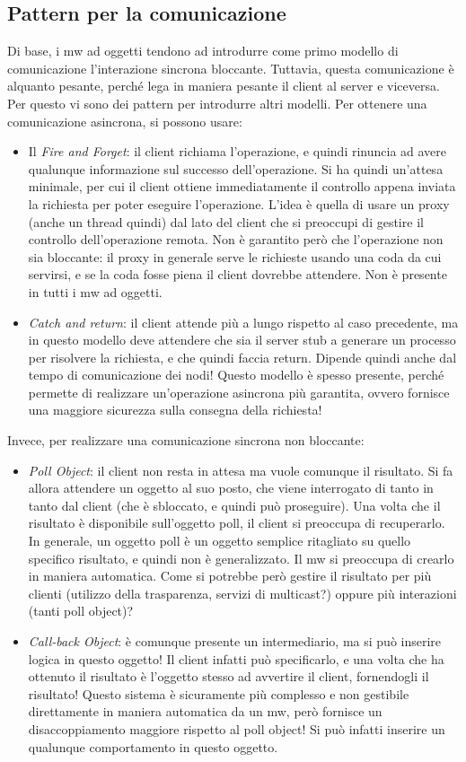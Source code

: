 \subsection{Pattern per la comunicazione}
Di base, i mw ad oggetti tendono ad introdurre come primo modello di comunicazione l'interazione sincrona bloccante.
Tuttavia, questa comunicazione è alquanto pesante, perché lega in maniera pesante il client al server e viceversa.
Per questo vi sono dei pattern per introdurre altri modelli.
Per ottenere una comunicazione asincrona, si possono usare:
\begin{itemize}
 \item Il \textit{Fire and Forget}: il client richiama l'operazione, e quindi rinuncia ad avere qualunque informazione
 sul successo dell'operazione. Si ha quindi un'attesa minimale, per cui il client ottiene immediatamente il controllo
 appena inviata la richiesta per poter eseguire l'operazione. L'idea è quella di usare un proxy (anche un thread quindi)
 dal lato del client che si preoccupi di gestire il controllo dell'operazione remota. Non è garantito però che
 l'operazione non sia bloccante: il proxy in generale serve le richieste usando una coda da cui servirsi, e se la coda
 fosse piena il client dovrebbe attendere. Non è presente in tutti i mw ad oggetti.
 \item \textit{Catch and return}: il client attende più a lungo rispetto al caso precedente, ma in questo modello deve
 attendere che sia il server stub a generare un processo per risolvere la richiesta, e che quindi faccia return. Dipende
 quindi anche dal tempo di comunicazione dei nodi! Questo modello è spesso presente, perché permette di realizzare
 un'operazione asincrona più garantita, ovvero fornisce una maggiore sicurezza sulla consegna della richiesta!
\end{itemize}
Invece, per realizzare una comunicazione sincrona non bloccante:
\begin{itemize}
 \item \textit{Poll Object}: il client non resta in attesa ma vuole comunque il risultato.
 Si fa allora attendere un oggetto al suo posto, che viene interrogato di tanto in tanto dal client (che è sbloccato,
 e quindi può proseguire). Una volta che il risultato è disponibile sull'oggetto poll, il client si preoccupa di
 recuperarlo.
 In generale, un oggetto poll è un oggetto semplice ritagliato su quello specifico risultato, e quindi non è
 generalizzato. Il mw si preoccupa di crearlo in maniera automatica. Come si potrebbe però gestire il risultato per
 più clienti (utilizzo della trasparenza, servizi di multicast?) oppure più interazioni (tanti poll object)?
 \item \textit{Call-back Object}: è comunque presente un intermediario, ma si può inserire logica in questo oggetto!
 Il client infatti può specificarlo, e una volta che ha ottenuto il risultato è l'oggetto stesso ad avvertire il
 client, fornendogli il risultato! Questo sistema è sicuramente più complesso e non gestibile direttamente in maniera
 automatica da un mw, però fornisce un disaccoppiamento maggiore rispetto al poll object! Si può infatti inserire
 un qualunque comportamento in questo oggetto.
\end{itemize}
